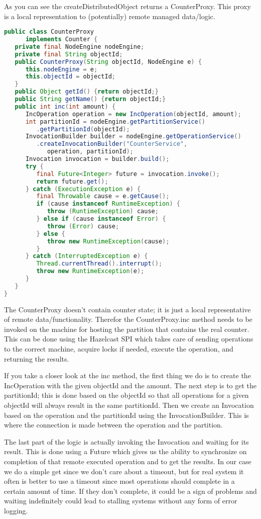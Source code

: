 As you can see the createDistributedObject returns a CounterProxy. This proxy is a local representation to (potentially) remote managed data/logic.  
\begin{lstlisting}[language=java]
public class CounterProxy 
      implements Counter {
   private final NodeEngine nodeEngine;
   private final String objectId;
   public CounterProxy(String objectId, NodeEngine e) {
      this.nodeEngine = e;
      this.objectId = objectId;
   }
   public Object getId() {return objectId;}
   public String getName() {return objectId;}
   public int inc(int amount) {
      IncOperation operation = new IncOperation(objectId, amount);   
      int partitionId = nodeEngine.getPartitionService()
         .getPartitionId(objectId);
      InvocationBuilder builder = nodeEngine.getOperationService()
         .createInvocationBuilder("CounterService", 
            operation, partitionId);
      Invocation invocation = builder.build();
      try {
         final Future<Integer> future = invocation.invoke();
         return future.get();
      } catch (ExecutionException e) {
         final Throwable cause = e.getCause();
         if (cause instanceof RuntimeException) {
            throw (RuntimeException) cause;
         } else if (cause instanceof Error) {
            throw (Error) cause;
         } else {
            throw new RuntimeException(cause);
         }
      } catch (InterruptedException e) {
         Thread.currentThread().interrupt();
         throw new RuntimeException(e);
      }
   }
}
\end{lstlisting}
The CounterProxy doesn't contain counter state; it is just a local representative of remote data/functionality. Therefor the CounterProxy.inc method needs to be invoked on the machine for hosting the partition that contains the real counter. This can be done using the Hazelcast SPI which takes care of sending operations to the correct machine, acquire locks if needed, execute the operation, and returning the results.

If you take a closer look at the inc method, the first thing we do is to create the IncOperation with the given objectId and the amount. The next step is to get the partitionId; this is done based on the objectId so that all operations for a given objectId will always result in the same partitionId. Then we create an Invocation based on the operation and the partitionId using the InvocationBuilder. This is where the connection is made between the operation and the partition. 

The last part of the logic is actually invoking the Invocation and waiting for its result. This is done using a Future which gives us the ability to synchronize on completion of that remote executed operation and to get the results. In our case we do a simple get since we don't care about a timeout, but for real system it often is better to use a timeout since most operations should complete in a certain amount of time. If they don't complete, it could be a sign of problems and waiting indefinitely could lead to stalling systems without any form of error logging.

